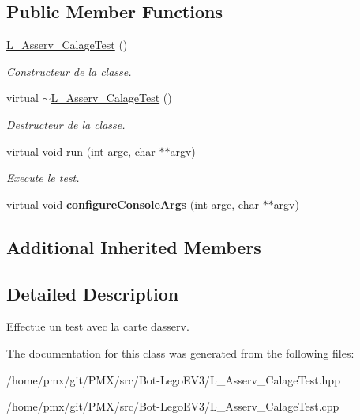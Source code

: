 \subsection*{Public Member Functions}
\begin{DoxyCompactItemize}
\item 
\mbox{\label{classL__Asserv__CalageTest_ac091a11473e82ca4ff1d3bcd2116edb2}} 
\hyperlink{classL__Asserv__CalageTest_ac091a11473e82ca4ff1d3bcd2116edb2}{L\+\_\+\+Asserv\+\_\+\+Calage\+Test} ()
\begin{DoxyCompactList}\small\item\em Constructeur de la classe. \end{DoxyCompactList}\item 
\mbox{\label{classL__Asserv__CalageTest_abe60851a0bdc1d7b6117a73d0aa99f1d}} 
virtual \hyperlink{classL__Asserv__CalageTest_abe60851a0bdc1d7b6117a73d0aa99f1d}{$\sim$\+L\+\_\+\+Asserv\+\_\+\+Calage\+Test} ()
\begin{DoxyCompactList}\small\item\em Destructeur de la classe. \end{DoxyCompactList}\item 
\mbox{\label{classL__Asserv__CalageTest_abc64058cdc72d378657e017e8b0e5f01}} 
virtual void \hyperlink{classL__Asserv__CalageTest_abc64058cdc72d378657e017e8b0e5f01}{run} (int argc, char $\ast$$\ast$argv)
\begin{DoxyCompactList}\small\item\em Execute le test. \end{DoxyCompactList}\item 
\mbox{\label{classL__Asserv__CalageTest_a85f81c832e28420569ab6a28f5e12c65}} 
virtual void {\bfseries configure\+Console\+Args} (int argc, char $\ast$$\ast$argv)
\end{DoxyCompactItemize}
\subsection*{Additional Inherited Members}


\subsection{Detailed Description}
Effectue un test avec la carte d\textquotesingle{}asserv. 

The documentation for this class was generated from the following files\+:\begin{DoxyCompactItemize}
\item 
/home/pmx/git/\+P\+M\+X/src/\+Bot-\/\+Lego\+E\+V3/L\+\_\+\+Asserv\+\_\+\+Calage\+Test.\+hpp\item 
/home/pmx/git/\+P\+M\+X/src/\+Bot-\/\+Lego\+E\+V3/L\+\_\+\+Asserv\+\_\+\+Calage\+Test.\+cpp\end{DoxyCompactItemize}
